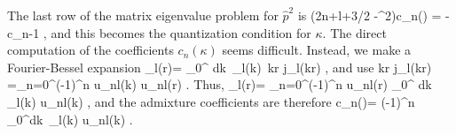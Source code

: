 	The last row of the matrix eigenvalue problem for $\hat{p}^2$ is
	\beq
	\label{quantize}
	(2n+l+3/2 -\kappa^2)c_n(\kappa) = -\, c_{n-1} \;,
	\eeq
	and this becomes the quantization condition for $\kappa$.  The direct
	computation of the coefficients $c_n(\kappa)$ seems difficult.
	Instead, we make a Fourier-Bessel expansion
	\beq
	\label{fourierbessel}
	\psi_{\kappa l}(r)= \sqrt{2\over \pi}\int\limits_0^\infty\! dk\,
	   \tilde{\psi}_{\kappa l}(k)\, kr j_l(kr) \;,
	\eeq
	and use
	\beq
	kr j_l(kr) =\sum_{n=0}^\infty (-1)^n u_{nl}(k) u_{nl}(r) \;.
	\eeq
	Thus,
	\beq
	\psi_{\kappa l}(r)= \sum_{n=0}^\infty (-1)^n u_{nl}(r)
	\int\limits_0^\infty\! dk\, \tilde{\psi}_{\kappa l}(k) u_{nl}(k) \;,
	\eeq
	and the admixture coefficients are therefore
	\beq
	c_n(\kappa)= (-1)^n \int\limits_0^\infty dk\, \tilde{\psi}_{\kappa l}(k)
	u_{nl}(k) \;.
	\eeq

